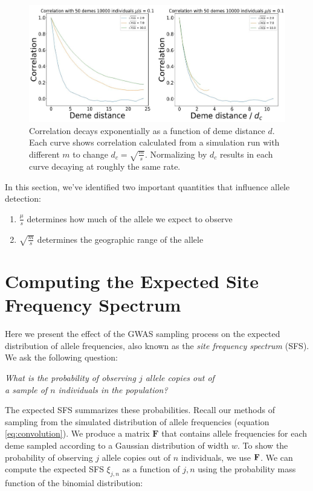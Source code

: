 \begin{figure}[h]
    \centering
    \includegraphics[scale=0.5]{img/correlation_curve.JPG}
    \caption{Correlation decays exponentially as a function of deme distance $d$. Each curve shows correlation calculated from a simulation run with different $m$ to change $d_c = \sqrt{\frac{m}{s}}$. Normalizing by $d_c$ results in each curve decaying at roughly the same rate.}
    \label{fig:correlation}
\end{figure}


In this section, we've identified two important quantities that influence allele detection:

\begin{enumerate}
    \item $\frac{\mu}{s}$ determines how much of the allele we expect to observe
    \item $\sqrt{\frac{m}{s}}$ determines the geographic range of the allele
\end{enumerate}

\newpage
\section{Computing the Expected Site Frequency Spectrum}
Here we present the effect of the GWAS sampling process on the expected distribution of allele frequencies, also known as the \textit{site frequency spectrum} (SFS). We ask the following question:

\begin{center}
    \textit{What is the probability of observing $j$ allele copies out of \\
    a sample of $n$ individuals in the population?}
\end{center}

The expected SFS summarizes these probabilities. Recall our methods of sampling from the simulated distribution of allele frequencies (equation \ref{eq:convolution}). We produce a matrix $\textbf{F}$ that contains allele frequencies for each deme sampled according to a Gaussian distribution of width $w$. To show the probability of observing $j$ allele copies out of $n$ individuals, we use $\bf{F}$. We can compute the expected SFS $\xi_{j,n}$ as a function of $j,n$ using the probability mass function of the binomial distribution:

